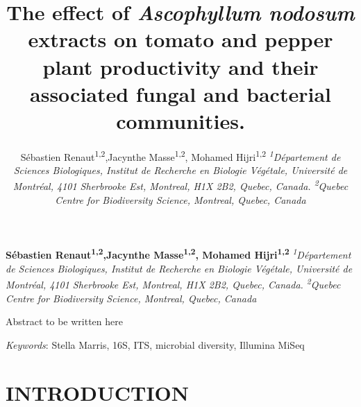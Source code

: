 \documentclass[11pt,]{article}
\title{\textbf{The effect of \emph{Ascophyllum nodosum} extracts on tomato and
pepper plant productivity and their associated fungal and bacterial
communities.}  }
\author{\Large Sébastien Renaut\textsuperscript{1,2},Jacynthe
Masse\textsuperscript{1,2}, Mohamed Hijri\textsuperscript{1,2}\vspace{0.05in} \newline\normalsize\emph{\textsuperscript{1}Département de Sciences Biologiques, Institut de
Recherche en Biologie Végétale, Université de Montréal, 4101 Sherbrooke
Est, Montreal, H1X 2B2, Quebec, Canada. \textsuperscript{2}Quebec Centre
for Biodiversity Science, Montreal, Quebec, Canada}  }
\date{}
\newcommand*{\authorfont}{\fontfamily{phv}\selectfont}
\renewenvironment{abstract}
 {{%
    \setlength{\leftmargin}{0mm}
    \setlength{\rightmargin}{\leftmargin}%
  }%
  \relax}
 {\endlist}
\begin{document}
	
%

{%
\setlength{\parindent}{0pt}
\thispagestyle{plain}
{\fontsize{18}{20}\selectfont\raggedright 
\maketitle  %

}

{
   \vskip 13.5pt\relax \normalsize\fontsize{11}{12} 
\textbf{\authorfont Sébastien Renaut\textsuperscript{1,2},Jacynthe
Masse\textsuperscript{1,2}, Mohamed Hijri\textsuperscript{1,2}} \hskip 15pt \emph{\small \textsuperscript{1}Département de Sciences Biologiques, Institut de
Recherche en Biologie Végétale, Université de Montréal, 4101 Sherbrooke
Est, Montreal, H1X 2B2, Quebec, Canada. \textsuperscript{2}Quebec Centre
for Biodiversity Science, Montreal, Quebec, Canada}   

}

}








\begin{abstract}

    \hbox{\vrule height .2pt width 39.14pc}

    \vskip 8.5pt %

\noindent Abstract to be written here


\vskip 8.5pt \noindent \emph{Keywords}: Stella Marris, 16S, ITS, microbial diversity, Illumina MiSeq \par

    \hbox{\vrule height .2pt width 39.14pc}



\end{abstract}


\vskip 6.5pt


\noindent \doublespacing \newpage 

\section{INTRODUCTION}\label{introduction}
\end{document}

